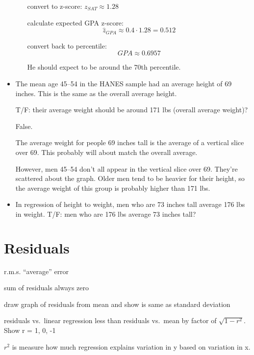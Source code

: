 \documentclass[letterpaper, landscape]{exam}
\begin{document}
\begin{itemize}
\begin{enumerate}[(a)]
          \begin{solution}
            convert to z-score: $z_{SAT} \approx 1.28$

            calculate expected GPA z-score: 
            \[
              \hat{z}_{GPA} \approx 0.4 \cdot 1.28 = 0.512
            \]

            convert back to percentile:
            \[
              GPA \approx 0.6957
            \]

            He should expect to be around the 70th percentile.

          \end{solution}
      \end{enumerate}

    \item The mean age 45--54 in the HANES sample had an average height of 69
      inches.  This is the same as the overall average height.

      T/F\@: their average weight should be around 171 lbs (overall average
      weight)?

      \begin{solution}
        False.  
        
        The average weight for people 69 inches tall is the average of a
        vertical slice over 69.  This probably will about match the overall
        average.

        However, men 45--54 don't all appear in the vertical slice over 69.
        They're scattered about the graph.  Older men tend to be heavier for
        their height, so the average weight of this group is probably higher
        than 171 lbs.
      \end{solution}

    \item In regression of height to weight, men who are 73 inches tall average
      176 lbs in weight. T/F\@: men who are 176 lbs average 73 inches tall?
  \end{itemize}

  \section{Residuals}

  \begin{itemize*}
    \item r.m.s. ``average'' error
    \item sum of residuals always zero
    \item draw graph of residuals from mean and show is same as standard deviation
    \item residuals vs.\ linear regression less than residuals vs.\ mean by
      factor of
      $\sqrt{1- r^2}$.  Show r = 1, 0, -1

    \item $r^2$ is measure how much regression explains variation in y based on
      variation in x.

  \end{itemize*}
\end{document}
